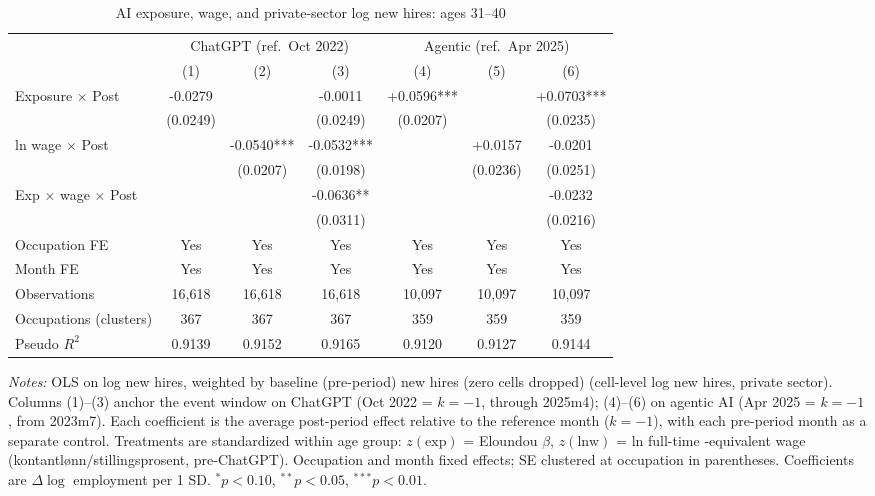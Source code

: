 \begin{table}[htbp]\centering
\caption{AI exposure, wage, and private-sector log new hires: ages 31–40}
\label{tab:ca_did_age2}
\small
\begin{tabular}{lcccccc}
\toprule
 & \multicolumn{3}{c}{ChatGPT (ref.\ Oct 2022)} & \multicolumn{3}{c}{Agentic (ref.\ Apr 2025)} \\
\cmidrule(lr){2-4} \cmidrule(lr){5-7}
 & (1) & (2) & (3) & (4) & (5) & (6) \\
\midrule
Exposure $\times$ Post & -0.0279 &  & -0.0011 & +0.0596*** &  & +0.0703*** \\
 & (0.0249) &  & (0.0249) & (0.0207) &  & (0.0235) \\
ln wage $\times$ Post &  & -0.0540*** & -0.0532*** &  & +0.0157 & -0.0201 \\
 &  & (0.0207) & (0.0198) &  & (0.0236) & (0.0251) \\
Exp $\times$ wage $\times$ Post &  &  & -0.0636** &  &  & -0.0232 \\
 &  &  & (0.0311) &  &  & (0.0216) \\
\midrule
Occupation FE & Yes & Yes & Yes & Yes & Yes & Yes \\
Month FE & Yes & Yes & Yes & Yes & Yes & Yes \\
Observations & 16,618 & 16,618 & 16,618 & 10,097 & 10,097 & 10,097 \\
Occupations (clusters) & 367 & 367 & 367 & 359 & 359 & 359 \\
Pseudo $R^2$ & 0.9139 & 0.9152 & 0.9165 & 0.9120 & 0.9127 & 0.9144 \\
\bottomrule
\end{tabular}
\begin{minipage}{\linewidth}\vspace{2pt}\footnotesize
\emph{Notes:} OLS on log new hires, weighted by baseline (pre-period) new hires (zero cells dropped) (cell-level log new hires, private sector). Columns (1)--(3) anchor the event window on ChatGPT (Oct 2022 = $k{=}{-}1$, through 2025m4); (4)--(6) on agentic AI (Apr 2025 = $k{=}{-}1$, from 2023m7). Each coefficient is the average post-period effect relative to the reference month ($k{=}{-}1$), with each pre-period month as a separate control. Treatments are standardized within age group: $z(\text{exp})$ = Eloundou $\beta$, $z(\text{lnw})$ = ln full-time -equivalent wage (kontantl\o nn$/$stillingsprosent, pre-ChatGPT). Occupation and month fixed effects; SE clustered at occupation in parentheses. Coefficients are $\Delta\log$ employment per 1 SD. $^{*}p<0.10$, $^{**}p<0.05$, $^{***}p<0.01$.
\end{minipage}
\end{table}